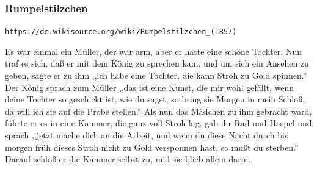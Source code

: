 \documentclass[10pt,a4paper]{article}
\begin{document}
\subsubsection{Rumpelstilzchen}

\verb+https://de.wikisource.org/wiki/Rumpelstilzchen_(1857)+

\vskip 4pt
Es war einmal ein Müller, der war arm, aber er hatte eine schöne Tochter. Nun
traf es sich, daß er mit dem König zu sprechen kam, und um sich ein Ansehen zu
geben, sagte er zu ihm ,,ich habe eine Tochter, die kann Stroh zu Gold spinnen.''
Der König sprach zum Müller ,,das ist eine Kunst, die mir wohl gefällt, wenn
deine Tochter so geschickt ist, wie du sagst, so bring sie Morgen in mein
Schloß, da will ich sie auf die Probe stellen.'' Als nun das Mädchen zu ihm
gebracht ward, führte er es in eine Kammer, die ganz voll Stroh lag, gab ihr Rad
und Haspel und sprach ,,jetzt mache dich an die Arbeit, und wenn du diese Nacht
durch bis morgen früh dieses Stroh nicht zu Gold versponnen hast, so mußt du
sterben.'' Darauf schloß er die Kammer selbst zu, und sie blieb allein darin.
\end{document}
